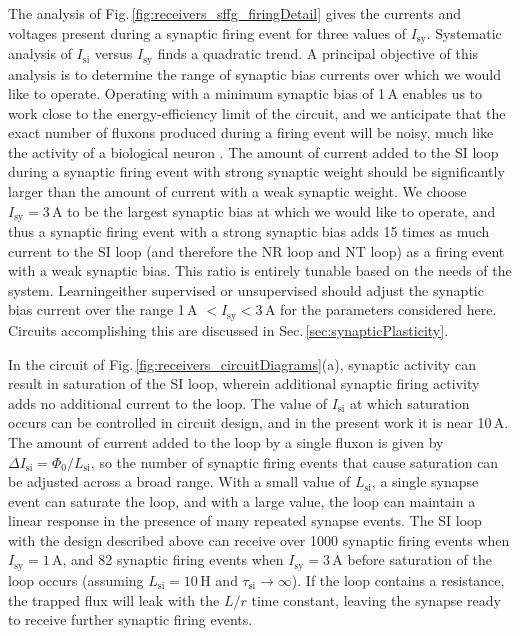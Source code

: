 \documentclass[twocolumn]{article}
\begin{document}
The analysis of Fig.\,\ref{fig:receivers_sffg_firingDetail} gives the currents and voltages present during a synaptic firing event for three values of $I_{\mathrm{sy}}$. Systematic analysis of $I_{\mathrm{si}}$ versus $I_{\mathrm{sy}}$ finds a quadratic trend. A principal objective of this analysis is to determine the range of synaptic bias currents over which we would like to operate. Operating with a minimum synaptic bias of 1\,\textmu A enables us to work close to the energy-efficiency limit of the circuit, and we anticipate that the exact number of fluxons produced during a firing event will be noisy, much like the activity of a biological neuron \cite{stgo2005}. The amount of current added to the SI loop during a synaptic firing event with strong synaptic weight should be significantly larger than the amount of current with a weak synaptic weight. We choose $I_{\mathrm{sy}} = 3$\,\textmu A to be the largest synaptic bias at which we would like to operate, and thus a synaptic firing event with a strong synaptic bias adds 15 times as much current to the SI loop (and therefore the NR loop and NT loop) as a firing event with a weak synaptic bias. This ratio is entirely tunable based on the needs of the system. Learning\textemdash either supervised or unsupervised \textemdash should adjust the synaptic bias current over the range 1\,\textmu A $< I_{\mathrm{sy}} < 3$\,\textmu A for the parameters considered here. Circuits accomplishing this are discussed in Sec.\,\ref{sec:synapticPlasticity}.

In the circuit of Fig.\,\ref{fig:receivers_circuitDiagrams}(a), synaptic activity can result in saturation of the SI loop, wherein additional synaptic firing activity adds no additional current to the loop. The value of $I_{\mathrm{si}}$ at which saturation occurs can be controlled in circuit design, and in the present work it is near 10\,\textmu A.  The amount of current added to the loop by a single fluxon is given by $\Delta I_{\mathrm{si}} = \Phi_0/L_{\mathrm{si}}$, so the number of synaptic firing events that cause saturation can be adjusted across a broad range. With a small value of $L_{\mathrm{si}}$, a single synapse event can saturate the loop, and with a large value, the loop can maintain a linear response in the presence of many repeated synapse events. The SI loop with the design described above can receive over 1000 synaptic firing events when $I_{\mathrm{sy}} = 1$\,\textmu A, and 82 synaptic firing events when $I_{\mathrm{sy}} = 3$\,\textmu A before saturation of the loop occurs (assuming $L_{\mathrm{si}} = 10$\,\textmu H and $\tau_{\mathrm{si}}\rightarrow \infty$). If the loop contains a resistance, the trapped flux will leak with the $L/r$ time constant, leaving the synapse ready to receive further synaptic firing events.
\end{document}
